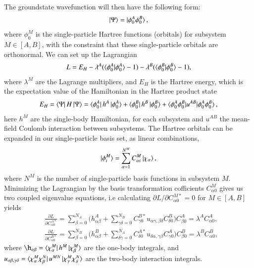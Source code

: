 \documentclass{subfiles}
\begin{document}
The groundstate wavefunction will then have the following form:
\begin{align*}
    \ket{\Psi} = \ket{\phi^A_0\phi^B_0},
\end{align*}
where $\phi_0^M$ is the single-particle Hartree functions (orbitals) for subsystem $M\in[A,B]$, with the constraint that these single-particle orbitals are orthonormal. We can set up the Lagrangian
\begin{align*}
    L = E_H - \lambda^A(\braket{\phi^A_0|\phi^A_0} - 1) - \lambda^B(\braket{\phi^B_0|\phi^B_0} - 1),
\end{align*}
where $\lambda^M$ are the Lagrange multipliers, and $E_H$ is the Hartree energy, which is the expectation value of the Hamiltonian in the Hartree product state
\begin{align*}
    E_H = \bra{\Psi}H\ket{\Psi} = \bra{\phi^A_0}h^A\ket{\phi^A_0} + \bra{\phi^B_0}h^B\ket{\phi^B_0} + \braket{\phi^A_0\phi^B_0|u^{AB}|\phi^A_0\phi^B_0},
\end{align*}
here $h^M$ are the single-body Hamiltonian, for each subsystem and $u^{AB}$ the mean-field Coulomb interaction between subsystems. The Hartree orbitals can be expanded in our single-particle basis set, as linear combinations, 
\begin{align*}
    \ket{\phi^M_i} = \sum_{\alpha=1}^{N^M} C^M_{\alpha i}\ket{\chi_\alpha},
\end{align*}
where $N^M$ is the number of single-particle basis functions in subsystem $M$. Minimizing the Lagrangian by the basis transformation cofficients $C_{\alpha 0}^M$ gives us two coupled eigenvalue equations, i.e calculating $\partial L/\partial C_{\alpha 0}^{M*} = 0$ for $M\in[A,B]$ yields
\begin{align}
    &\frac{\partial L}{\partial C_{\alpha 0}^{A*}}  = \sum_{\beta=0}^{N_A}\big(h_{\alpha\beta}^A + \sum^{N_B}_{\gamma\delta=0}C^{B*}_{\gamma0} u_{\alpha\gamma,\beta\delta}C^B_{\delta0} \big)C^A_{\beta 0}  = \lambda^AC^A_{\alpha 0},\nonumber \\
    &\frac{\partial L}{\partial C_{\alpha 0}^{B*}}  = \sum_{\beta=0}^{N_B}\big(h_{\alpha\beta}^B + \sum^{N_A}_{\delta\gamma=0}C^{A*}_{\delta0} u_{\delta\alpha,\gamma\beta}C^A_{\gamma0} \big)C^B_{\beta 0}  = \lambda^BC^B_{\alpha 0}\label{eq:bipartite_hartree},
\end{align}
where $\h_{\alpha\beta} = \bra{\chi_\alpha^M}h^M\ket{\chi_\beta^M}$ are the one-body integrals, and $u_{\alpha\beta,\gamma\delta} = \bra{\chi_\alpha^M\chi_\beta^N}u^{MN}\ket{\chi_\gamma^M\chi_\delta^N}$ are the two-body interaction integrals.  \\\\
\end{document}
